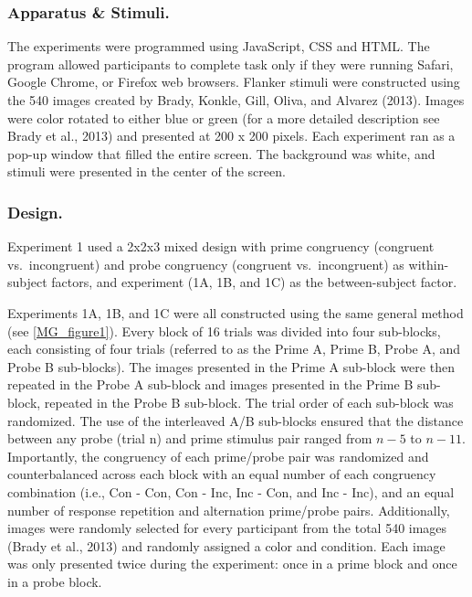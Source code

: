 \documentclass[]{DissertateCUNY}
\begin{document}
\hypertarget{apparatus-stimuli.}{%
\subsubsection{Apparatus \& Stimuli.}\label{apparatus-stimuli.}}

The experiments were programmed using JavaScript, CSS and HTML. The
program allowed participants to complete task only if they were running
Safari, Google Chrome, or Firefox web browsers. Flanker stimuli were
constructed using the 540 images created by Brady, Konkle, Gill, Oliva,
and Alvarez (2013). Images were color rotated to either blue or green
(for a more detailed description see Brady et al., 2013) and presented
at 200 x 200 pixels. Each experiment ran as a pop-up window that filled
the entire screen. The background was white, and stimuli were presented
in the center of the screen.

\hypertarget{design.}{%
\subsubsection{Design.}\label{design.}}

Experiment 1 used a 2x2x3 mixed design with prime congruency (congruent
vs.~incongruent) and probe congruency (congruent vs.~incongruent) as
within-subject factors, and experiment (1A, 1B, and 1C) as the
between-subject factor.

Experiments 1A, 1B, and 1C were all constructed using the same general
method (see \ref{MG_figure1}). Every block of 16 trials was divided into
four sub-blocks, each consisting of four trials (referred to as the
Prime A, Prime B, Probe A, and Probe B sub-blocks). The images presented
in the Prime A sub-block were then repeated in the Probe A sub-block and
images presented in the Prime B sub-block, repeated in the Probe B
sub-block. The trial order of each sub-block was randomized. The use of
the interleaved A/B sub-blocks ensured that the distance between any
probe (trial n) and prime stimulus pair ranged from \(n-5\) to \(n-11\).
Importantly, the congruency of each prime/probe pair was randomized and
counterbalanced across each block with an equal number of each
congruency combination (i.e., Con - Con, Con - Inc, Inc - Con, and Inc -
Inc), and an equal number of response repetition and alternation
prime/probe pairs. Additionally, images were randomly selected for every
participant from the total 540 images (Brady et al., 2013) and randomly
assigned a color and condition. Each image was only presented twice
during the experiment: once in a prime block and once in a probe block.
\end{document}
